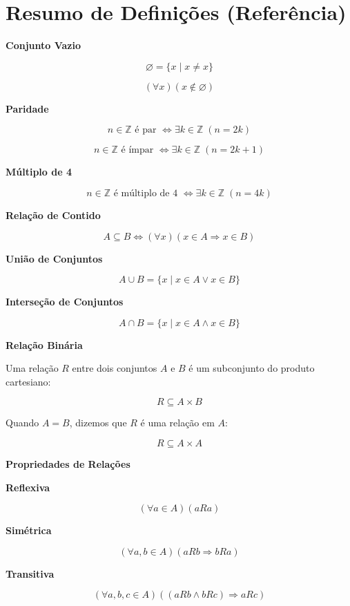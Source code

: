 \documentclass[12pt,a4paper]{article}
\begin{document}

\section*{Resumo de Definições (Referência)}

\textbf{Conjunto Vazio}

\[
\varnothing = \{x \mid x \neq x\}
\]

\[
(\forall x)(x \notin \varnothing)
\]

\textbf{Paridade}

\[
n \in \mathbb{Z} \text{ é par } \Leftrightarrow \exists k \in \mathbb{Z} \; (n = 2k)
\]

\[
n \in \mathbb{Z} \text{ é ímpar } \Leftrightarrow \exists k \in \mathbb{Z} \; (n = 2k + 1)
\]

\textbf{Múltiplo de 4}

\[
n \in \mathbb{Z} \text{ é múltiplo de 4 } \Leftrightarrow \exists k \in \mathbb{Z} \; (n = 4k)
\]

\vspace{0.3cm}

\textbf{Relação de Contido}

\[
A \subseteq B \Leftrightarrow (\forall x)(x \in A \Rightarrow x \in B)
\]

\vspace{0.3cm}

\textbf{União de Conjuntos}

\[
A \cup B = \{x \mid x \in A \lor x \in B\}
\]

\vspace{0.3cm}

\textbf{Interseção de Conjuntos}

\[
A \cap B = \{x \mid x \in A \land x \in B\}
\]

\vspace{0.3cm}

\textbf{Relação Binária}

Uma relação $R$ entre dois conjuntos $A$ e $B$ é um subconjunto do produto cartesiano:

\[
R \subseteq A \times B
\]

Quando $A=B$, dizemos que $R$ é uma relação em $A$:

\[
R \subseteq A \times A
\]

\vspace{0.3cm}

\textbf{Propriedades de Relações}

\textbf{Reflexiva}

\[
(\forall a \in A)(aRa)
\]

\textbf{Simétrica}

\[
(\forall a,b \in A)(aRb \Rightarrow bRa)
\]

\textbf{Transitiva}

\[
(\forall a,b,c \in A)((aRb \land bRc) \Rightarrow aRc)
\]
\end{document}

